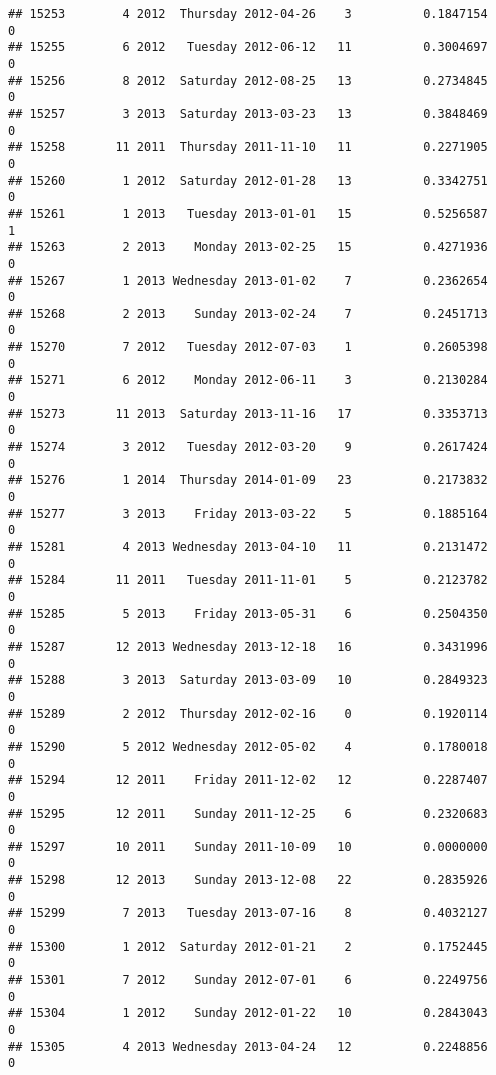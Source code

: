 \documentclass[
]{article}
\begin{document}
\begin{verbatim}
## 15253        4 2012  Thursday 2012-04-26    3          0.1847154             0
## 15255        6 2012   Tuesday 2012-06-12   11          0.3004697             0
## 15256        8 2012  Saturday 2012-08-25   13          0.2734845             0
## 15257        3 2013  Saturday 2013-03-23   13          0.3848469             0
## 15258       11 2011  Thursday 2011-11-10   11          0.2271905             0
## 15260        1 2012  Saturday 2012-01-28   13          0.3342751             0
## 15261        1 2013   Tuesday 2013-01-01   15          0.5256587             1
## 15263        2 2013    Monday 2013-02-25   15          0.4271936             0
## 15267        1 2013 Wednesday 2013-01-02    7          0.2362654             0
## 15268        2 2013    Sunday 2013-02-24    7          0.2451713             0
## 15270        7 2012   Tuesday 2012-07-03    1          0.2605398             0
## 15271        6 2012    Monday 2012-06-11    3          0.2130284             0
## 15273       11 2013  Saturday 2013-11-16   17          0.3353713             0
## 15274        3 2012   Tuesday 2012-03-20    9          0.2617424             0
## 15276        1 2014  Thursday 2014-01-09   23          0.2173832             0
## 15277        3 2013    Friday 2013-03-22    5          0.1885164             0
## 15281        4 2013 Wednesday 2013-04-10   11          0.2131472             0
## 15284       11 2011   Tuesday 2011-11-01    5          0.2123782             0
## 15285        5 2013    Friday 2013-05-31    6          0.2504350             0
## 15287       12 2013 Wednesday 2013-12-18   16          0.3431996             0
## 15288        3 2013  Saturday 2013-03-09   10          0.2849323             0
## 15289        2 2012  Thursday 2012-02-16    0          0.1920114             0
## 15290        5 2012 Wednesday 2012-05-02    4          0.1780018             0
## 15294       12 2011    Friday 2011-12-02   12          0.2287407             0
## 15295       12 2011    Sunday 2011-12-25    6          0.2320683             0
## 15297       10 2011    Sunday 2011-10-09   10          0.0000000             0
## 15298       12 2013    Sunday 2013-12-08   22          0.2835926             0
## 15299        7 2013   Tuesday 2013-07-16    8          0.4032127             0
## 15300        1 2012  Saturday 2012-01-21    2          0.1752445             0
## 15301        7 2012    Sunday 2012-07-01    6          0.2249756             0
## 15304        1 2012    Sunday 2012-01-22   10          0.2843043             0
## 15305        4 2013 Wednesday 2013-04-24   12          0.2248856             0

\end{verbatim}
\end{document}
